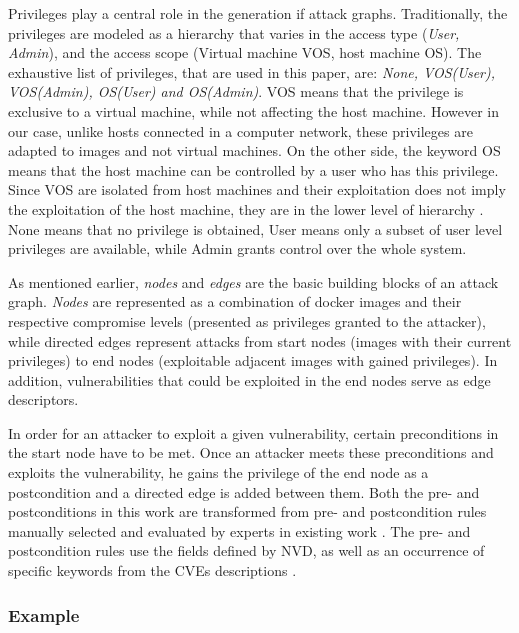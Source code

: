 Privileges play a central role in the generation if attack graphs. Traditionally, the privileges are modeled as a hierarchy that varies in the access type (\textit{User, Admin}), and the access scope (Virtual machine VOS, host machine OS). The exhaustive list of privileges, that are used in this paper, are: \textit{None, VOS(User), VOS(Admin), OS(User) and OS(Admin)}. VOS means that the privilege is exclusive to a virtual machine, while not affecting the host machine. However in our case, unlike hosts connected in a computer network, these privileges are adapted to images and not virtual machines. On the other side, the keyword OS means that the  host machine can be controlled by a user who has this privilege. Since VOS are isolated from host machines and their exploitation does not imply the exploitation of the host machine, they are in the lower level of hierarchy \cite{aksu2018automated}. None means that no privilege is obtained, User means only a subset of user level privileges are available, while Admin grants control over the whole system.

As mentioned earlier, \textit{nodes} and \textit{edges} are the basic building blocks of an attack graph. \textit{Nodes} are represented as a combination of docker images and their respective compromise levels (presented as privileges granted to the attacker), while directed edges represent attacks from start nodes (images with their current privileges) to end nodes (exploitable adjacent images with gained privileges). In addition, vulnerabilities that could be exploited in the end nodes serve as edge descriptors.

In order for an attacker to exploit a given vulnerability, certain preconditions in the start node have to be met. Once an attacker meets these preconditions and exploits the vulnerability, he gains the privilege of the end node as a postcondition and a directed edge is added between them. Both the pre- and postconditions in this work are transformed from pre- and postcondition rules manually selected and evaluated by experts in existing work \cite{aksu2018automated}. The pre- and postcondition rules use the fields defined by NVD, as well as an occurrence of specific keywords from the CVEs descriptions \cite{booth2013national}.

\subsubsection{Example}

